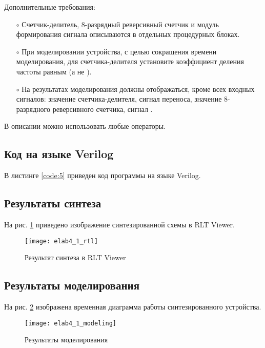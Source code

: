Дополнительные требования:
\begin{itemize}
	\item[$\circ$] Счетчик-делитель, 8-разрядный реверсивный счетчик и модуль формирования сигнала  описываются в отдельных процедурных блоках.
	\item[$\circ$] При моделировании устройства, с целью сокращения времени моделирования, для счетчика-делителя установите коэффициент деления частоты равным  (а не ).
	\item[$\circ$] На результатах моделирования должны отображаться, кроме всех входных сигналов: значение счетчика-делителя, сигнал переноса, значение 8-разрядного реверсивного счетчика, сигнал .
\end{itemize}

В описании можно использовать любые операторы.

\subsection{Код на языке Verilog}

В листинге \ref{code:5} приведен код программы на языке Verilog.



\subsection{Результаты синтеза}

На рис. \ref{fig:elab4_1_rtl} приведено изображение синтезированной схемы в RLT Viewer.

\begin{figure}[H]
\begin{center}
	\texttt{[image: elab4\_1\_rtl]}
	\caption{Результат синтеза в RLT Viewer}
	\label{fig:elab4_1_rtl}
\end{center}
\end{figure}

\subsection{Результаты моделирования}
\label{sec:elab4_1_modeling}

На рис. \ref{fig:elab4_1_modeling} изображена временная диаграмма работы синтезированного устройства. 

\begin{figure}[H]
\begin{center}
	\texttt{[image: elab4\_1\_modeling]}
	\caption{Результаты моделирования}
	\label{fig:elab4_1_modeling}
\end{center}
\end{figure}

